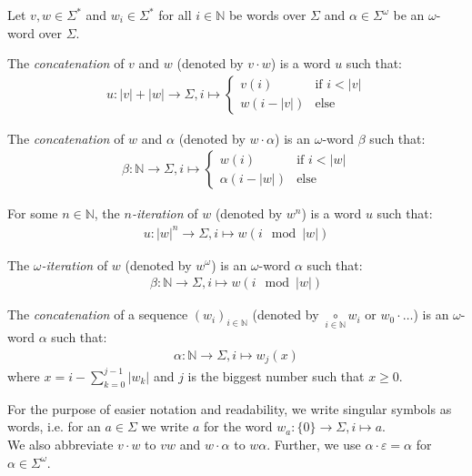 \begin{defn}
	Let $v, w \in \Sigma^*$ and $w_i \in \Sigma^*$ for all $i \in \mathbb{N}$ be words over $\Sigma$ and $\alpha \in \Sigma^\omega$ be an $\omega$-word over $\Sigma$.
	
	The \emph{concatenation} of $v$ and $w$ (denoted by $v \cdot w$) is a word $u$ such that:
	\begin{align*}
	u : |v|+|w| \allowbreak \rightarrow \Sigma, i \mapsto 
	\begin{cases}
		v(i) & \text{if } i < |v| \\
		w(i-|v|) & \text{else}
	\end{cases}
	\end{align*}

	The \emph{concatenation} of $w$ and $\alpha$ (denoted by $w \cdot \alpha$) is an $\omega$-word $\beta$ such that:
	\begin{align*}
	\beta : \mathbb{N} \rightarrow \Sigma, i \mapsto 
	\begin{cases}
		w(i) & \text{if } i < |w| \\
		\alpha(i-|w|) & \text{else}
	\end{cases}
	\end{align*}
	
	For some $n \in \mathbb{N}$, the \emph{$n$-iteration} of $w$ (denoted by $w^n$) is a word $u$ such that:
	\begin{align*}
		u : |w|^n \rightarrow \Sigma, i \mapsto w(i \mod |w|)
	\end{align*}
	
	The \emph{$\omega$-iteration} of $w$ (denoted by $w^\omega$) is an $\omega$-word $\alpha$ such that:
	\begin{align*}
		\beta : \mathbb{N} \rightarrow \Sigma, i \mapsto w(i \mod |w|)
	\end{align*}
	
	The \emph{concatenation} of a sequence $(w_i)_{i \in \mathbb{N}}$ (denoted by $\underset{i \in \mathbb{N}}{\circ} w_i$ or $w_0 \cdot \dots$) is an $\omega$-word $\alpha$ such that:
	\begin{align*}
		\alpha : \mathbb{N} \rightarrow \Sigma, i \mapsto w_j(x)
	\end{align*}
	where $x = i - \sum\limits_{k = 0}^{j-1} |w_k|$ and $j$ is the biggest number such that $x \geq 0$.
\end{defn}

\vspace{20pt}
For the purpose of easier notation and readability, we write singular symbols as words, i.e. for an $a \in \Sigma$ we write $a$ for the word $w_a : \{0\} \rightarrow \Sigma, i \mapsto a$.\\
We also abbreviate $v \cdot w$ to $vw$ and $w \cdot \alpha$ to $w \alpha$. Further, we use $\alpha \cdot \varepsilon = \alpha$ for $\alpha \in \Sigma^\omega$.
\vspace{10pt}

